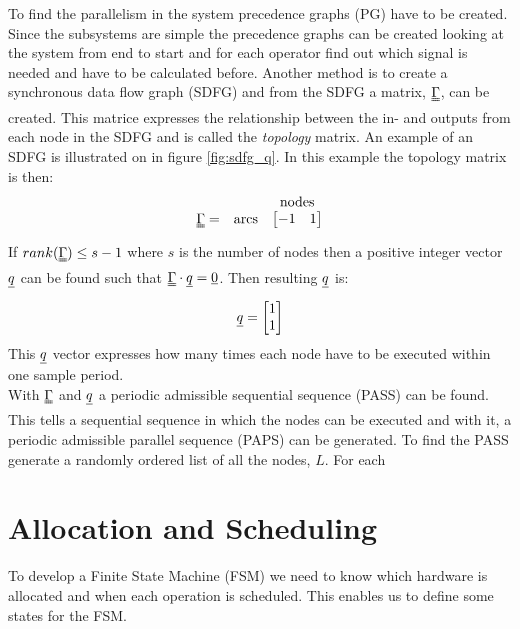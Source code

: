 To find the parallelism in the system precedence graphs (PG) have to be created. Since the subsystems are simple the precedence graphs can be created looking at the system from end to start and for each operator find out which signal is needed and have to be calculated before. Another method is to create a synchronous data flow graph (SDFG) and from the SDFG a matrix, $\uuline\Gamma$, can be created. This matrice expresses the relationship between the in- and outputs from each node in the SDFG and is called the \textit{topology} matrix. An example of an SDFG is illustrated on in figure \ref{fig:sdfg_q}. In this example the topology matrix is then:
\begin{equation}
  \begin{array}{ c c c }
    & & \text{nodes} \\
  \uuline\Gamma = & \text{arcs} & 
  \begin{bmatrix}
   -1 & 1 
  \end{bmatrix}
  \end{array}
\end{equation}
If $rank(\uuline \Gamma) \leq s-1$ where $s$ is the number of nodes then a positive integer vector $\uline q$ can be found such that $\uuline\Gamma \cdot \uline q = \uline 0$. Then resulting $\uline q$ is:
\begin{equation}
  \uline{q} =
  \begin{bmatrix}
  1 \\
  1
  \end{bmatrix}
\end{equation}
This $\uline q$ vector expresses how many times each node have to be executed within one sample period.\\

With $\uuline \Gamma$ and $\uline q$ a periodic admissible sequential sequence (PASS) can be found. This tells a sequential sequence in which the nodes can be executed and with it, a periodic admissible parallel sequence (PAPS) can be generated. To find the PASS generate a randomly ordered list of all the nodes, $L$. For each 

\section{Allocation and Scheduling}\label{sec:allocsched}
To develop a Finite State Machine (FSM) we need to know which hardware is allocated and when each operation is scheduled. This enables us to define some states for the FSM.

